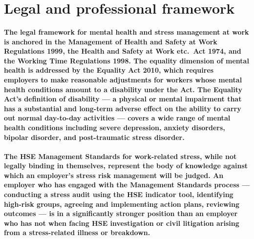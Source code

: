 
\section{Legal and professional framework}

\paragraph{The legal framework for mental health and stress management at work is anchored in the Management of Health and Safety at Work Regulations 1999, the Health and Safety at Work etc.\ Act 1974, and the Working Time Regulations 1998. The equality dimension of mental health is addressed by the Equality Act 2010, which requires employers to make reasonable adjustments for workers whose mental health conditions amount to a disability under the Act. The Equality Act's definition of disability --- a physical or mental impairment that has a substantial and long-term adverse effect on the ability to carry out normal day-to-day activities --- covers a wide range of mental health conditions including severe depression, anxiety disorders, bipolar disorder, and post-traumatic stress disorder.}

\paragraph{The HSE Management Standards for work-related stress, while not legally binding in themselves, represent the body of knowledge against which an employer's stress risk management will be judged. An employer who has engaged with the Management Standards process --- conducting a stress audit using the HSE indicator tool, identifying high-risk groups, agreeing and implementing action plans, reviewing outcomes --- is in a significantly stronger position than an employer who has not when facing HSE investigation or civil litigation arising from a stress-related illness or breakdown.}


